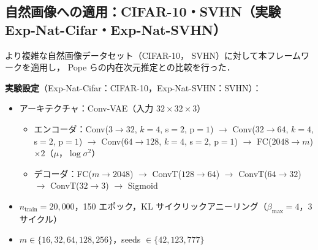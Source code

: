 \documentclass[11pt,a4paper]{jsarticle}
\begin{document}
\subsection{自然画像への適用：CIFAR-10・SVHN（実験 Exp-Nat-Cifar・Exp-Nat-SVHN）}\label{sec:exp_natural}

より複雑な自然画像データセット（CIFAR-10\cite{krizhevsky2009learning}，
SVHN\cite{netzer2011reading}）に対して本フレームワークを適用し，
Pope ら\cite{pope2021intrinsic}の内在次元推定との比較を行った．

\textbf{実験設定}（Exp-Nat-Cifar：CIFAR-10，Exp-Nat-SVHN：SVHN）：
\begin{itemize}
  \item アーキテクチャ：Conv-VAE（入力 $32 \times 32 \times 3$）
        \begin{itemize}
          \item エンコーダ：Conv($3\to32$, $k=4$, s$=2$, p$=1$) $\to$ Conv($32\to64$, $k=4$, s$=2$, p$=1$) $\to$
                Conv($64\to128$, $k=4$, s$=2$, p$=1$) $\to$ FC($2048 \to m$) $\times 2$（$\mu$，$\log\sigma^2$）
          \item デコーダ：FC($m \to 2048$) $\to$ ConvT($128\to64$) $\to$ ConvT($64\to32$) $\to$ ConvT($32\to3$) $\to$ Sigmoid
        \end{itemize}
  \item $n_{\mathrm{train}} = 20{,}000$，150 エポック，KL サイクリックアニーリング（$\beta_{\max}=4$，3サイクル）
  \item $m \in \{16, 32, 64, 128, 256\}$，seeds $\in \{42, 123, 777\}$
\end{itemize}
\end{document}
